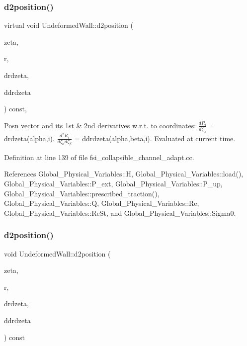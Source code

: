 \subsubsection{\texorpdfstring{d2position()}{d2position()}\hspace{0.1cm}{\footnotesize\ttfamily [1/4]}}
{\footnotesize\ttfamily virtual void Undeformed\+Wall\+::d2position (\begin{DoxyParamCaption}\item[{const Vector$<$ double $>$ \&}]{zeta,  }\item[{Vector$<$ double $>$ \&}]{r,  }\item[{Dense\+Matrix$<$ double $>$ \&}]{drdzeta,  }\item[{Rank\+Three\+Tensor$<$ double $>$ \&}]{ddrdzeta }\end{DoxyParamCaption}) const\hspace{0.3cm}{\ttfamily [inline]}, {\ttfamily [virtual]}}



Posn vector and its 1st \& 2nd derivatives w.\+r.\+t. to coordinates\+: $ \frac{dR_i}{d \zeta_\alpha}$ = drdzeta(alpha,i). $ \frac{d^2R_i}{d \zeta_\alpha d \zeta_\beta}$ = ddrdzeta(alpha,beta,i). Evaluated at current time. 



Definition at line 139 of file fsi\+\_\+collapsible\+\_\+channel\+\_\+adapt.\+cc.



References Global\+\_\+\+Physical\+\_\+\+Variables\+::H, Global\+\_\+\+Physical\+\_\+\+Variables\+::load(), Global\+\_\+\+Physical\+\_\+\+Variables\+::\+P\+\_\+ext, Global\+\_\+\+Physical\+\_\+\+Variables\+::\+P\+\_\+up, Global\+\_\+\+Physical\+\_\+\+Variables\+::prescribed\+\_\+traction(), Global\+\_\+\+Physical\+\_\+\+Variables\+::Q, Global\+\_\+\+Physical\+\_\+\+Variables\+::\+Re, Global\+\_\+\+Physical\+\_\+\+Variables\+::\+Re\+St, and Global\+\_\+\+Physical\+\_\+\+Variables\+::\+Sigma0.

\mbox{\label{classUndeformedWall_a6e25add1790f0de89bbe6840dae66a93}} 
\subsubsection{\texorpdfstring{d2position()}{d2position()}\hspace{0.1cm}{\footnotesize\ttfamily [2/4]}}
{\footnotesize\ttfamily void Undeformed\+Wall\+::d2position (\begin{DoxyParamCaption}\item[{const Vector$<$ double $>$ \&}]{zeta,  }\item[{Vector$<$ double $>$ \&}]{r,  }\item[{Dense\+Matrix$<$ double $>$ \&}]{drdzeta,  }\item[{Rank\+Three\+Tensor$<$ double $>$ \&}]{ddrdzeta }\end{DoxyParamCaption}) const\hspace{0.3cm}{\ttfamily [inline]}}



